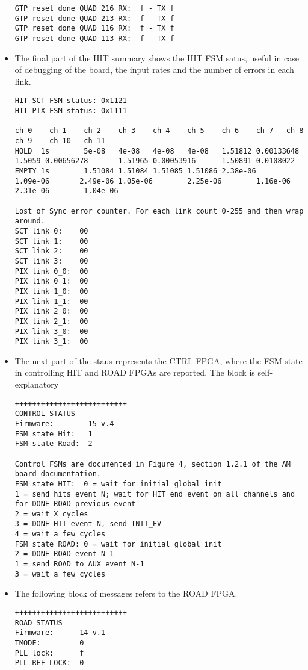 \documentclass[UKenglish]{latex/atlasdoc}
\begin{document}
\begin{itemize}
\begin{verbatim}
GTP reset done QUAD 216 RX:  f - TX f
GTP reset done QUAD 213 RX:  f - TX f
GTP reset done QUAD 116 RX:  f - TX f
GTP reset done QUAD 113 RX:  f - TX f
\end{verbatim}

	\item The final part of the HIT summary shows the HIT FSM satus,
	useful in case of debugging of the board, the input rates and the number
	of errors in each link.
\begin{verbatim}
HIT SCT FSM status: 0x1121
HIT PIX FSM status: 0x1111

ch 0    ch 1    ch 2    ch 3    ch 4    ch 5    ch 6    ch 7   ch 8     ch 9    ch 10   ch 11
HOLD  1s        5e-08   4e-08   4e-08   4e-08   1.51812 0.00133648      1.5059 0.00656278       1.51965 0.00053916      1.50891 0.0108022
EMPTY 1s        1.51084 1.51084 1.51085 1.51086 2.38e-06        1.09e-06       2.49e-06 1.05e-06        2.25e-06        1.16e-06        2.31e-06        1.04e-06

Lost of Sync error counter. For each link count 0-255 and then wrap around.
SCT link 0:    00
SCT link 1:    00
SCT link 2:    00
SCT link 3:    00
PIX link 0_0:  00
PIX link 0_1:  00
PIX link 1_0:  00
PIX link 1_1:  00
PIX link 2_0:  00
PIX link 2_1:  00
PIX link 3_0:  00
PIX link 3_1:  00
\end{verbatim}

	\item The next part of the staus represents the CTRL FPGA, where
	the FSM state in controlling HIT and ROAD FPGAs are reported. The
	block is self-explanatory
\begin{verbatim}
++++++++++++++++++++++++++
CONTROL STATUS
Firmware:        15 v.4
FSM state Hit:   1
FSM state Road:  2

Control FSMs are documented in Figure 4, section 1.2.1 of the AM board documentation.
FSM state HIT:  0 = wait for initial global init
1 = send hits event N; wait for HIT end event on all channels and for DONE ROAD previous event
2 = wait X cycles
3 = DONE HIT event N, send INIT_EV
4 = wait a few cycles
FSM state ROAD: 0 = wait for initial global init
2 = DONE ROAD event N-1
1 = send ROAD to AUX event N-1
3 = wait a few cycles
\end{verbatim}

	\item The following block of messages refers to the ROAD FPGA. 
\begin{verbatim}
++++++++++++++++++++++++++
ROAD STATUS
Firmware:      14 v.1
TMODE:         0
PLL lock:      f
PLL REF LOCK:  0


\end{verbatim}
\end{itemize}
\end{document}
